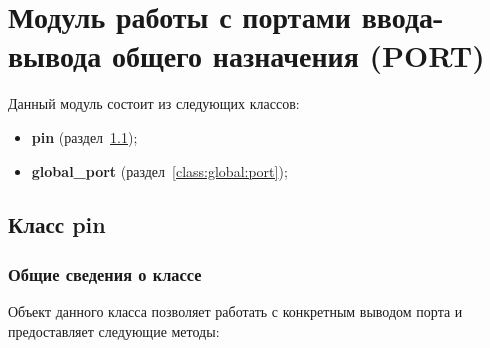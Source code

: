 \section{Модуль работы с портами ввода-вывода общего назначения (PORT)}\label{port:0}
Данный модуль состоит из следующих классов:
\begin{itemize}
	\item \textbf{pin} (раздел~\ref{class:pin});
	\item \textbf{global\_port} (раздел~\ref{class:global:port});
\end{itemize}

\subsection{Класс pin}\label{class:pin}
\subsubsection{Общие сведения о классе}
Объект данного класса позволяет работать с конкретным выводом порта и предоставляет следующие методы:
